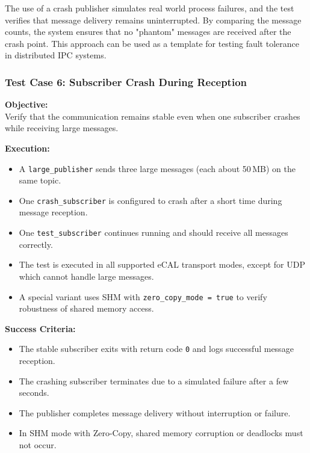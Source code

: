 \vspace{1em}

The use of a crash publisher simulates real world process failures, and the test verifies that message delivery remains uninterrupted. By comparing the message counts, the system ensures that no "phantom" messages are received after the crash point. This approach can be used as a template for testing fault tolerance in distributed IPC systems.

\vspace{1em}
\subsubsection{Test Case 6: Subscriber Crash During Reception}
\label{sec:tc6}

\textbf{Objective:} \\
Verify that the communication remains stable even when one subscriber crashes while receiving large messages.

\vspace{0.5em}
\textbf{Execution:}
\begin{itemize}
	\item A \texttt{large\_publisher} sends three large messages (each about 50\,MB) on the same topic.
	\item One \texttt{crash\_subscriber} is configured to crash after a short time during message reception.
	\item One \texttt{test\_subscriber} continues running and should receive all messages correctly.
	\item The test is executed in all supported eCAL transport modes, except for UDP which cannot handle large messages.
	\item A special variant uses SHM with \texttt{zero\_copy\_mode = true} to verify robustness of shared memory access.
\end{itemize}

\textbf{Success Criteria:}
\begin{itemize}
	\item The stable subscriber exits with return code \texttt{0} and logs successful message reception.
	\item The crashing subscriber terminates due to a simulated failure after a few seconds.
	\item The publisher completes message delivery without interruption or failure.
	\item In SHM mode with Zero-Copy, shared memory corruption or deadlocks must not occur.
\end{itemize}

